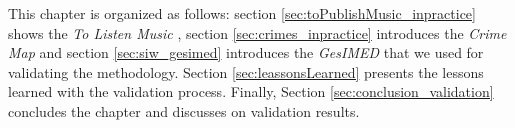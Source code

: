  






This chapter is organized as follows: section
\ref{sec:toPublishMusic_inpractice} shows the \textit{To Listen Music}
, section \ref{sec:crimes_inpractice} introduces the
 \textit{Crime Map} and section \ref{sec:siw_gesimed}
introduces the \textit{GesIMED}  that we used for
validating the methodology. Section \ref{sec:leassonsLearned} presents the lessons learned
with the validation process. Finally, Section \ref{sec:conclusion_validation} concludes
the chapter and discusses on validation results.


% 
% 



